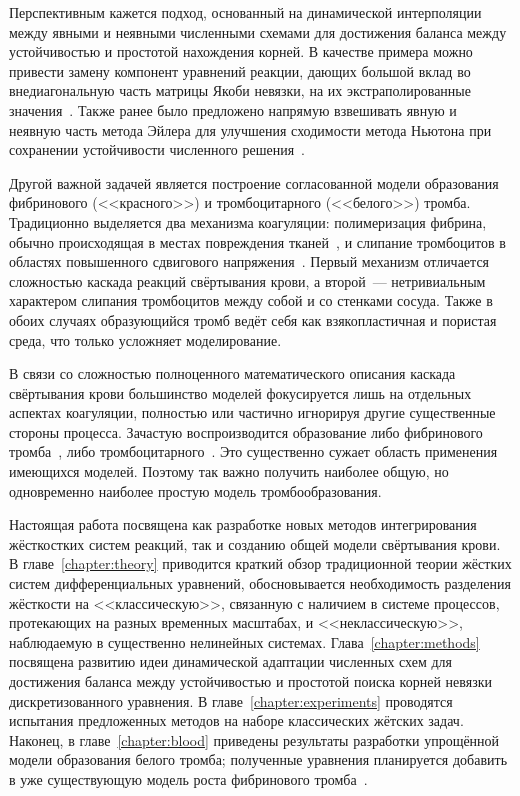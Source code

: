 Перспективным кажется подход, основанный на динамической интерполяции между явными и неявными численными схемами
для достижения баланса между устойчивостью и простотой нахождения корней.
В качестве примера можно привести замену компонент уравнений реакции,
дающих большой вклад во внедиагональную часть матрицы Якоби невязки,
на их экстраполированные значения~\cite{vassilevski2020parallel}.
Также ранее было предложено напрямую взвешивать явную и неявную часть метода Эйлера для
улучшения сходимости метода Ньютона при сохранении устойчивости численного решения~\cite{butakov2022two_methods}.

Другой важной задачей является построение согласованной модели образования фибринового (<<красного>>)
и тромбоцитарного (<<белого>>) тромба.
Традиционно выделяется два механизма коагуляции:
полимеризация фибрина, обычно происходящая в местах повреждения тканей~\cite{panteleev2008coagulation, ushakova2018gemo},
и слипание тромбоцитов в областях повышенного сдвигового напряжения~\cite{rahman2019platelet_adhesion, savage1996platelet_adhesion, avtaeva2022vWF}.
Первый механизм отличается сложностью каскада реакций свёртывания крови,
а второй~--- нетривиальным характером слипания тромбоцитов между собой и со стенками сосуда.
Также в обоих случаях образующийся тромб ведёт себя как взякопластичная и пористая среда,
что только усложняет моделирование.

В связи со сложностью полноценного математического описания каскада свёртывания крови
большинство моделей фокусируется лишь на отдельных аспектах коагуляции,
полностью или частично игнорируя другие существенные стороны процесса.
Зачастую воспроизводится образование либо фибринового тромба~\cite{bouchnita2020mathematical, vassilevski2020parallel},
либо тромбоцитарного~\cite{sorensen1999platelets_deposition_model, goodman2005thrombosis_model, taylor2016thrombosis_model, wu2017deposition_model}.
Это существенно сужает область применения имеющихся моделей.
Поэтому так важно получить наиболее общую,
но одновременно наиболее простую модель тромбообразования.

Настоящая работа посвящена как разработке новых методов интегрирования жёсткостких систем реакций,
так и созданию общей модели свёртывания крови.
В главе~\ref{chapter:theory} приводится краткий обзор традиционной теории жёстких систем дифференциальных уравнений,
обосновывается необходимость разделения жёсткости на <<классическую>>,
связанную с наличием в системе процессов, протекающих на разных временных масштабах,
и <<неклассическую>>, наблюдаемую в существенно нелинейных системах.
Глава~\ref{chapter:methods} посвящена развитию идеи динамической адаптации численных схем
для достижения баланса между устойчивостью и простотой поиска корней невязки дискретизованного уравнения.
В главе~\ref{chapter:experiments} проводятся испытания предложенных методов на наборе классических жётских задач.
Наконец, в главе~\ref{chapter:blood} приведены результаты разработки упрощённой модели образования белого тромба;
полученные уравнения планируется добавить в уже существующую модель роста
фибринового тромба~\cite{bouchnita2020mathematical, vassilevski2020parallel}.

